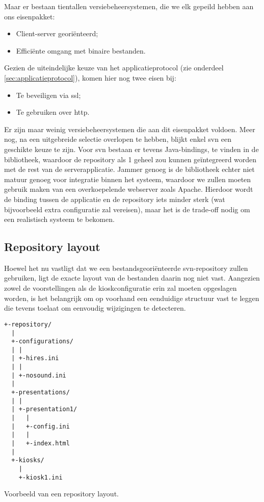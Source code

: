 Maar er bestaan tientallen versiebeheersystemen, die we elk gepeild hebben aan ons eisenpakket:
\begin{itemize}
\item Client-server georiënteerd;
\item Efficiënte omgang met binaire bestanden.
\end{itemize}

Gezien de uiteindelijke keuze van het applicatieprotocol (zie onderdeel \ref{sec:applicatieprotocol}), komen hier nog twee eisen bij:
\begin{itemize}
\item Te beveiligen via \ac{ssl};
\item Te gebruiken over \ac{http}.
\end{itemize}

Er zijn maar weinig versiebeheersystemen die aan dit eisenpakket voldoen. Meer nog, na een uitgebreide selectie overlopen te hebben, blijkt enkel \ac{svn} een geschikte keuze te zijn. Voor \ac{svn} bestaan er tevens Java-bindings, te vinden in de  bibliotheek, waardoor de repository als 1 geheel zou kunnen geïntegreerd worden met de rest van de serverapplicatie. Jammer genoeg is de bibliotheek echter niet matuur genoeg voor integratie binnen het systeem, waardoor we zullen moeten gebruik maken van een overkoepelende webserver zoals Apache. Hierdoor wordt de binding tussen de applicatie en de repository iets minder sterk (wat bijvoorbeeld extra configuratie zal vereisen), maar het is de trade-off nodig om een realistisch systeem te bekomen.

\subsection{Repository layout}

Hoewel het nu vastligt dat we een bestandsgeoriënteerde \ac{svn}-repository zullen gebruiken, ligt de exacte layout van de bestanden daarin nog niet vast. Aangezien zowel de voorstellingen als de kioskconfiguratie erin zal moeten opgeslagen worden, is het belangrijk om op voorhand een eenduidige structuur vast te leggen die tevens toelaat om eenvoudig wijzigingen te detecteren.

\begin{code}
\begin{verbatim}
+-repository/
  |
  +-configurations/
  | |
  | +-hires.ini
  | |
  | +-nosound.ini
  |
  +-presentations/
  | |
  | +-presentation1/
  |   |
  |   +-config.ini
  |   |
  |   +-index.html
  |
  +-kiosks/
    |
    +-kiosk1.ini
\end{verbatim}
\caption{Voorbeeld van een repository layout.}
\end{code}

